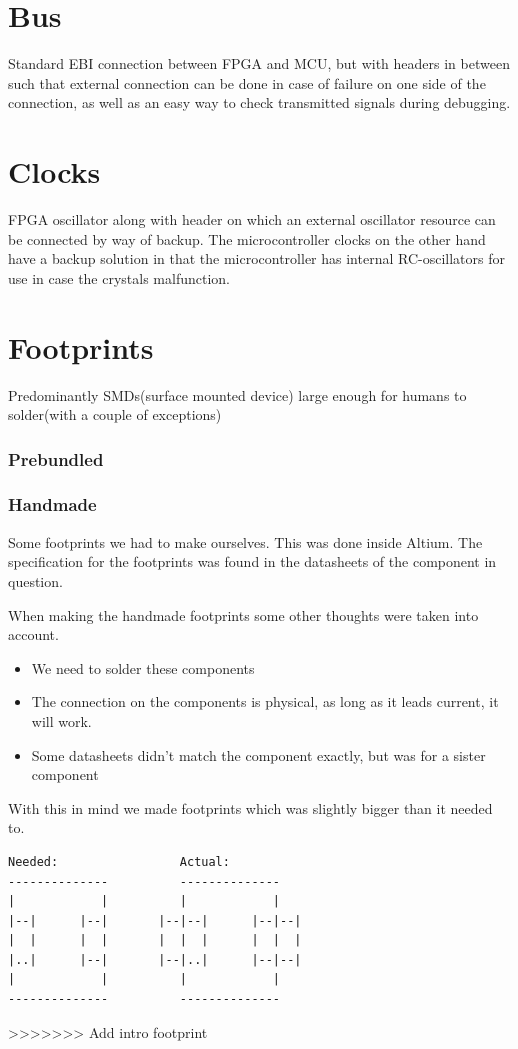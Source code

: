 \documentclass[../main/report.tex]{subfiles}
\begin{document}
\section{Bus}
Standard EBI connection between FPGA and MCU, but with headers in between such that external connection can be done in case of failure on one side of the connection, as well as an easy way to check transmitted signals during debugging.

\section{Clocks}
FPGA oscillator along with header on which an external oscillator resource can be connected by way of backup.
The microcontroller clocks on the other hand have a backup solution in that the microcontroller has internal RC-oscillators for use in case the crystals malfunction.


\section{Footprints}
Predominantly SMDs(surface mounted device) large enough for humans to solder(with a couple of exceptions)




\subsubsection{Prebundled}

\subsubsection{Handmade}
Some footprints we had to make ourselves.
This was done inside Altium.
The specification for the footprints was found in the datasheets of the component in question.

When making the handmade footprints some other thoughts were taken into account.

\begin{itemize}
    \item We need to solder these components
    \item The connection on the components is physical, as long as it leads current, it will work.
    \item Some datasheets didn't match the component exactly, but was for a sister component
\end{itemize}

With this in mind we made footprints which was slightly bigger than it needed to.

\begin{verbatim}
Needed:                 Actual:
--------------          --------------
|            |          |            |
|--|      |--|       |--|--|      |--|--|
|  |      |  |       |  |  |      |  |  |
|..|      |--|       |--|..|      |--|--|
|            |          |            |
--------------          --------------
\end{verbatim}
>>>>>>> Add intro footprint
\end{document}
